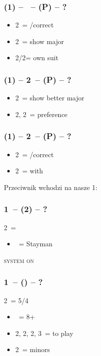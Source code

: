 \documentclass[12pt, a4paper]{article}
\begin{document}
\subsubsection*{(1\ntx) -- \dbl\ -- (P) -- ?}
\begin{itemize}
    \item 2\clubs\ = \pass/correct
    \item 2\diams\ = show major
    \item 2\hearts/2\spades = own suit
\end{itemize}

\subsubsection*{(1\ntx) -- 2\clubs\ -- (P) -- ?}
\begin{itemize}
    \item 2\diams\ = show better major
    \item 2\hearts, 2\spades\ = preference
\end{itemize}

\subsubsection*{(1\ntx) -- 2\diams\ -- (P) -- ?}
\begin{itemize}
    \item 2\hearts\ = \pass/correct
    \item 2\spades\ = \inv with \hearts
\end{itemize}

Przeciwnik wchodzi na nasze 1\nt:

\subsubsection*{1\ntx\ -- (2\clubs) -- ?}
2\clubs\ = \clubs
\begin{itemize}
    \item \dbl\ = Stayman
\end{itemize}

\textsc{system on}

\subsubsection*{1\ntx\ -- (\alrts{2\clubs}) -- ?}
2\clubs\ = 5/4 \major
\begin{itemize}
    \item \dbl\ = 8+
    \item 2\diams, 2\hearts, 2\spades, 3\clubs\ = to play
    \item 2\nt\ = minors
\end{itemize}
\end{document}
